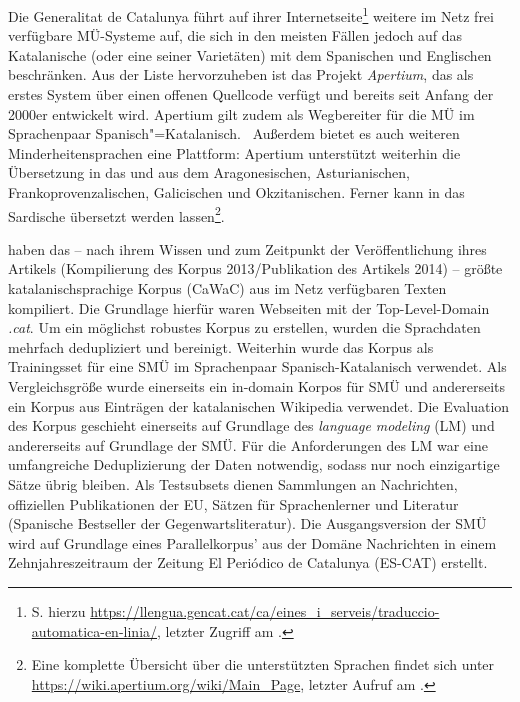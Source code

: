 Die Generalitat de Catalunya führt auf ihrer Internetseite\footnote{S. hierzu \url{https://llengua.gencat.cat/ca/eines_i_serveis/traduccio-automatica-en-linia/}, letzter Zugriff am \datum{}.} weitere im Netz frei verfügbare MÜ-Systeme auf, die sich in den meisten Fällen jedoch auf das Katalanische (oder eine seiner Varietäten) mit dem Spanischen und Englischen beschränken. Aus der Liste hervorzuheben ist das Projekt \emph{Apertium}, das als erstes System über einen offenen Quellcode verfügt und bereits seit Anfang der 2000er entwickelt wird. Apertium gilt zudem als Wegbereiter für die MÜ im Sprachenpaar Spanisch"=Katalanisch.~\citep[24]{moreno_llengua_2012} Außerdem bietet es auch weiteren Minderheitensprachen eine Plattform: Apertium unterstützt weiterhin die Übersetzung in das und aus dem Aragonesischen, Asturianischen, Frankoprovenzalischen, Galicischen und Okzitanischen. Ferner kann in das Sardische übersetzt werden lassen\footnote{Eine komplette Übersicht über die unterstützten Sprachen findet sich unter \url{https://wiki.apertium.org/wiki/Main_Page}, letzter Aufruf am \datum{}.}.

\citet{ljubesic_cawac_2014} haben das – nach ihrem Wissen und zum Zeitpunkt der Veröffentlichung ihres Artikels (Kompilierung des Korpus 2013\slash Publikation des Artikels 2014) – größte katalanischsprachige Korpus (CaWaC) aus im Netz verfügbaren Texten kompiliert. Die Grundlage hierfür waren Webseiten mit der Top-Level-Domain \emph{.cat}. Um ein möglichst robustes Korpus zu erstellen, wurden die Sprachdaten mehrfach dedupliziert und bereinigt. Weiterhin wurde das Korpus als Trainingsset für eine SMÜ im Sprachenpaar Spanisch-Katalanisch verwendet. Als Vergleichsgröße wurde einerseits ein in-domain Korpos für SMÜ und andererseits ein Korpus aus Einträgen der katalanischen Wikipedia verwendet.
Die Evaluation des Korpus geschieht einerseits auf Grundlage des \emph{language modeling} (LM) und andererseits auf Grundlage der SMÜ. Für die Anforderungen des LM war eine umfangreiche Deduplizierung der Daten notwendig, sodass nur noch einzigartige Sätze übrig bleiben.
Als Testsubsets dienen Sammlungen an Nachrichten, offiziellen Publikationen der EU, Sätzen für Sprachenlerner und Literatur (Spanische Bestseller der Gegenwartsliteratur).
Die Ausgangsversion der SMÜ wird auf Grundlage eines Parallelkorpus' aus der Domäne Nachrichten in einem Zehnjahreszeitraum der Zeitung \glqq El Periódico de Catalunya\grqq{} (ES-CAT) erstellt.


